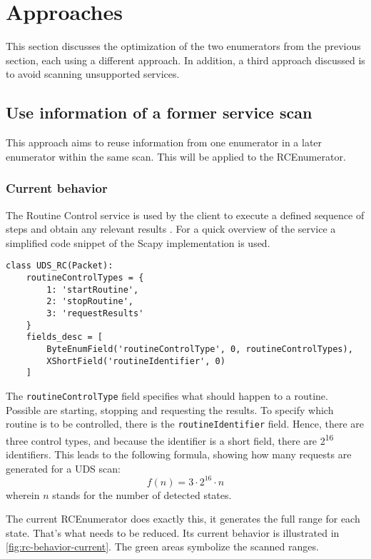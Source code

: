 \section{Approaches}

This section discusses the optimization of the two enumerators from the previous section, each using a different approach. In addition, a third approach discussed is to avoid scanning unsupported services. 

\subsection{Use information of a former service scan}

This approach aims to reuse information from one enumerator in a later enumerator within the same scan. This will be applied to the RCEnumerator.

\subsubsection{Current behavior}

The Routine Control service is used by the client to execute a defined sequence of steps and obtain any relevant results \cite{iso14229}. For a quick overview of the service a simplified code snippet of the Scapy implementation is used.

\begin{samepage}
\begin{verbatim}
class UDS_RC(Packet):
    routineControlTypes = {
        1: 'startRoutine',
        2: 'stopRoutine',
        3: 'requestResults'
    }
    fields_desc = [
        ByteEnumField('routineControlType', 0, routineControlTypes),
        XShortField('routineIdentifier', 0)
    ]
\end{verbatim}
\end{samepage}

The \texttt{routineControlType} field specifies what should happen to a routine. Possible are starting, stopping and requesting the results. To specify which routine is to be controlled, there is the \texttt{routineIdentifier} field. Hence, there are three control types, and because the identifier is a short field, there are 2\textsuperscript{16} identifiers. This leads to the following formula, showing how many requests are generated for a UDS scan:
\[f(n)=3 \cdot 2^{16} \cdot n\]
wherein $n$ stands for the number of detected states.

The current RCEnumerator does exactly this, it generates the full range for each state. That's what needs to be reduced. Its current behavior is illustrated in \autoref{fig:rc-behavior-current}. The green areas symbolize the scanned ranges.

